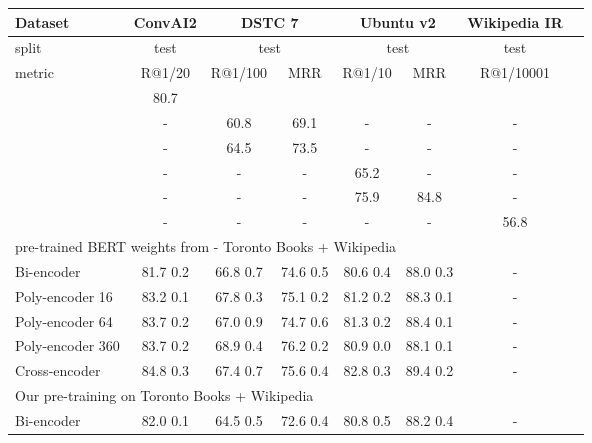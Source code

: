 \documentclass{article} \usepackage{iclr2020_conference,times}
\begin{document}
\begin{table*}[h]
\center
\setlength\tabcolsep{3.2pt} \small
\begin{tabular}{|l|c|c|c|c|c|c|c|}
\hline
 Dataset & \multicolumn{1}{c|}{ConvAI2} & \multicolumn{2}{c|}{DSTC 7} & \multicolumn{2}{c|}{Ubuntu v2} & Wikipedia IR\\
 \hline
 split  & test  & \multicolumn{2}{c|}{test}  & \multicolumn{2}{c|}{test} & test \\
 \hline
metric & R@1/20 & R@1/100 & MRR & R@1/10  & MRR & R@1/10001\\
\hline
\hline
\citep{wolf2019transfertransfo} & 80.7 & & & & & \\
\hline
\citep{gu} & - & 60.8 & 69.1 & -  & - & - \\
\hline
\citep{chen_noetic} & - & 64.5 &  73.5 & -  & -  & -  \\
\hline
\citep{yoon} & -  & -  & -  &  65.2 & - & -\\
\hline
\citep{dong_et_hal_ubuntu2}  & -  & -  & -  &  75.9 & 84.8 & -  \\
\hline
\citep{wu2018starspace}  & -  & -  & -  &  - & - & 56.8  \\
\hline
\hline
 \multicolumn{7}{|l|}{pre-trained BERT weights from \citep{devlin-etal-2019-bert} - Toronto Books + Wikipedia}  \\
\hline

Bi-encoder & 81.7  0.2 & 66.8  0.7 & 74.6  0.5 & 80.6  0.4 & 88.0  0.3 & -  \\ \hline 









Poly-encoder 16 & 83.2  0.1 & 67.8  0.3 & 75.1  0.2 & 81.2  0.2 & 88.3  0.1 & -  \\ \hline 



Poly-encoder 64 & 83.7  0.2 & 67.0  0.9 & 74.7  0.6 & 81.3  0.2 & 88.4  0.1 & -  \\ \hline 

Poly-encoder 360 & 83.7  0.2 & 68.9  0.4 & 76.2  0.2 & 80.9  0.0 & 88.1  0.1 & -  \\ \hline 

Cross-encoder & 84.8  0.3 & 67.4  0.7  & 75.6  0.4 & 82.8  0.3 & 89.4  0.2 & -  \\
\hline 
\hline 
 \multicolumn{7}{|l|}{Our pre-training on Toronto Books + Wikipedia}  \\ 
 \hline 
Bi-encoder & 82.0  0.1 & 64.5  0.5 & 72.6  0.4 & 80.8  0.5 & 88.2  0.4 & -  \\ \hline 








\end{tabular}
\end{table*}
\end{document}
